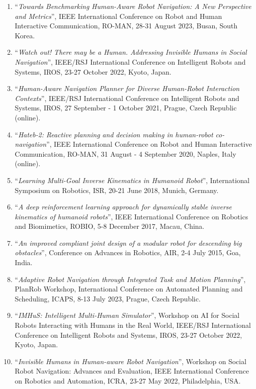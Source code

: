 \documentclass[11pt]{article}
\newcommand{\htwo}[2]{\par\vspace{8pt}{\fontsize{13}{16}\selectfont\bfseries\raggedright
  \leftskip=7.6mm\hangindent=9.6mm\hangafter=1\makebox[9.6mm][l]{#1}#2\par}\vspace{6pt}}
\begin{document}
\htwo{5.5.}{Oral communications}
\begin{enumerate}[label={\arabic*.},leftmargin=*,topsep=0pt,itemsep=1pt,parsep=0pt]
    \item ``\textit{Towards Benchmarking Human-Aware Robot Navigation: A New Perspective and Metrics}'', IEEE International Conference on Robot and Human Interactive Communication, RO-MAN, 28-31 August 2023, Busan, South Korea.
    \item ``\textit{Watch out! There may be a Human. Addressing Invisible Humans in Social Navigation}'', IEEE/RSJ International Conference on Intelligent Robots and Systems, IROS, 23-27 October 2022, Kyoto, Japan.
    \item ``\textit{Human-Aware Navigation Planner for Diverse Human-Robot Interaction Contexts}'', IEEE/RSJ International Conference on Intelligent Robots and Systems, IROS, 27 September - 1 October 2021, Prague, Czech Republic (online).
    \item ``\textit{Hateb-2: Reactive planning and decision making in human-robot co-navigation}'', IEEE International Conference on Robot and Human Interactive Communication, RO-MAN, 31 August - 4 September 2020, Naples, Italy (online).
    \item ``\textit{Learning Multi-Goal Inverse Kinematics in Humanoid Robot}'', International Symposium on Robotics, ISR, 20-21 June 2018, Munich, Germany.
    \item ``\textit{A deep reinforcement learning approach for dynamically stable inverse kinematics of humanoid robots}'', IEEE International Conference on Robotics and Biomimetics, ROBIO, 5-8 December 2017, Macau, China.
    \item ``\textit{An improved compliant joint design of a modular robot for descending big obstacles}'', Conference on Advances in Robotics, AIR, 2-4 July 2015, Goa, India.
    \item ``\textit{Adaptive Robot Navigation through Integrated Task and Motion Planning}'', PlanRob Workshop, International Conference on Automated Planning and Scheduling, ICAPS, 8-13 July 2023, Prague, Czech Republic.
    \item ``\textit{IMHuS: Intelligent Multi-Human Simulator}'', Workshop on AI for Social Robots Interacting with Humans in the Real World, IEEE/RSJ International Conference on Intelligent Robots and Systems, IROS, 23-27 October 2022, Kyoto, Japan.
    \item ``\textit{Invisible Humans in Human-aware Robot Navigation}'', Workshop on Social Robot Navigation: Advances and Evaluation, IEEE International Conference on Robotics and Automation, ICRA, 23-27 May 2022, Philadelphia, USA.
\end{enumerate}
\end{document}
